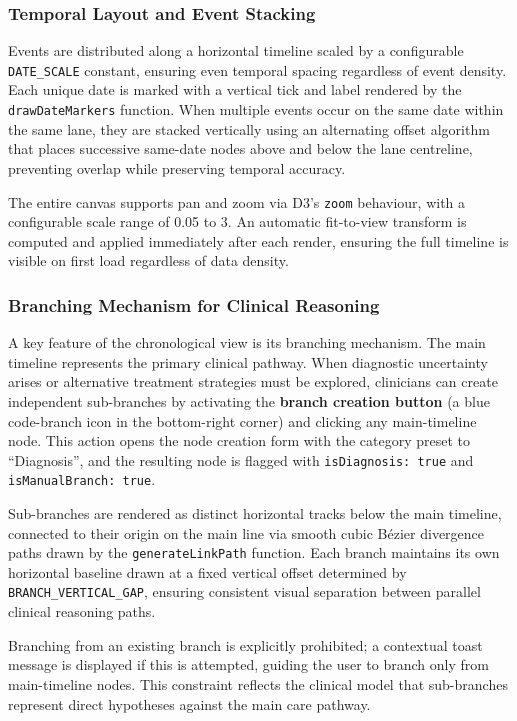 \subsubsection{Temporal Layout and Event Stacking}

Events are distributed along a horizontal timeline scaled by a configurable
\texttt{DATE\_SCALE} constant, ensuring even temporal spacing regardless of
event density. Each unique date is marked with a vertical tick and label
rendered by the \texttt{drawDateMarkers} function. When multiple events occur
on the same date within the same lane, they are stacked vertically using an
alternating offset algorithm that places successive same-date nodes above and
below the lane centreline, preventing overlap while preserving temporal
accuracy.

The entire canvas supports pan and zoom via D3's \texttt{zoom} behaviour, with
a configurable scale range of 0.05\texttimes{} to 3\texttimes{}. An automatic
fit-to-view transform is computed and applied immediately after each render,
ensuring the full timeline is visible on first load regardless of data density.

\subsubsection{Branching Mechanism for Clinical Reasoning}

A key feature of the chronological view is its branching mechanism. The main
timeline represents the primary clinical pathway. When diagnostic uncertainty
arises or alternative treatment strategies must be explored, clinicians can
create independent sub-branches by activating the \textbf{branch creation
button} (a blue code-branch icon in the bottom-right corner) and clicking any
main-timeline node. This action opens the node creation form with the category
preset to ``Diagnosis'', and the resulting node is flagged with
\texttt{isDiagnosis: true} and \texttt{isManualBranch: true}.

Sub-branches are rendered as distinct horizontal tracks below the main
timeline, connected to their origin on the main line via smooth cubic B\'{e}zier
divergence paths drawn by the \texttt{generateLinkPath} function. Each branch
maintains its own horizontal baseline drawn at a fixed vertical offset
determined by \texttt{BRANCH\_VERTICAL\_GAP}, ensuring consistent visual
separation between parallel clinical reasoning paths.

Branching from an existing branch is explicitly prohibited; a contextual
toast message is displayed if this is attempted, guiding the user to branch
only from main-timeline nodes. This constraint reflects the clinical model
that sub-branches represent direct hypotheses against the main care pathway.

